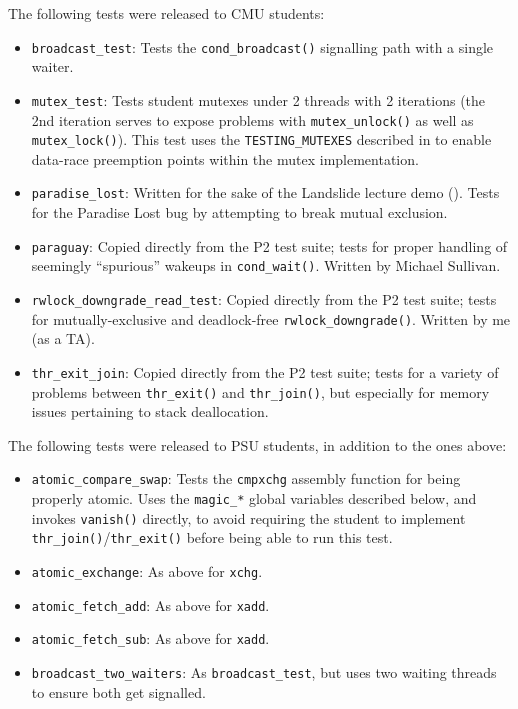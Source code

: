 
The following tests were released to CMU students:
\begin{itemize}
	\item {\tt broadcast\_test}:
		Tests the {\tt cond\_broadcast()} signalling path with a single waiter.
	\item {\tt mutex\_test}:
		Tests student mutexes under 2 threads with 2 iterations
		(the 2nd iteration serves to expose problems with {\tt mutex\_unlock()} as well as {\tt mutex\_lock()}).
		This test uses the {\tt TESTING\_MUTEXES}
		described in \sect{\ref{sec:landslide-staticconfig}}
		to enable data-race preemption points within the mutex implementation.
	\item {\tt paradise\_lost}:
		Written for the sake of the Landslide lecture demo
		(\sect{\ref{sec:education-pebbles-recruiting}}).
		Tests for the Paradise Lost bug by attempting to break mutual exclusion.
	\item {\tt paraguay}:
		Copied directly from the P2 test suite;
		tests for proper handling of seemingly ``spurious'' wakeups in {\tt cond\_wait()}.
		Written by Michael Sullivan.
	\item {\tt rwlock\_downgrade\_read\_test}:
		Copied directly from the P2 test suite;
		tests for mutually-exclusive and deadlock-free {\tt rwlock\_downgrade()}.
		Written by me (as a TA).
	\item {\tt thr\_exit\_join}:
		Copied directly from the P2 test suite;
		tests for a variety of problems between {\tt thr\_exit()} and {\tt thr\_join()},
		but especially for memory issues pertaining to stack deallocation.
\end{itemize}
\vspace{1em}

\noindent The following tests were released to PSU students, in addition to the ones above:
\begin{itemize}
	\item {\tt atomic\_compare\_swap}:
		Tests the {\tt cmpxchg} assembly function for being properly atomic.
		Uses the {\tt magic\_*} global variables described below, and invokes {\tt vanish()} directly,
		to avoid requiring the student to implement {\tt thr\_join()}/{\tt thr\_exit()}
		before being able to run this test.
	\item {\tt atomic\_exchange}:
		As above for {\tt xchg}.
	\item {\tt atomic\_fetch\_add}:
		As above for {\tt xadd}.
	\item {\tt atomic\_fetch\_sub}:
		As above for {\tt xadd}.
	\item {\tt broadcast\_two\_waiters}:
		As {\tt broadcast\_test}, but uses two waiting threads to ensure both get signalled.
\end{itemize}
\vspace{1em}


